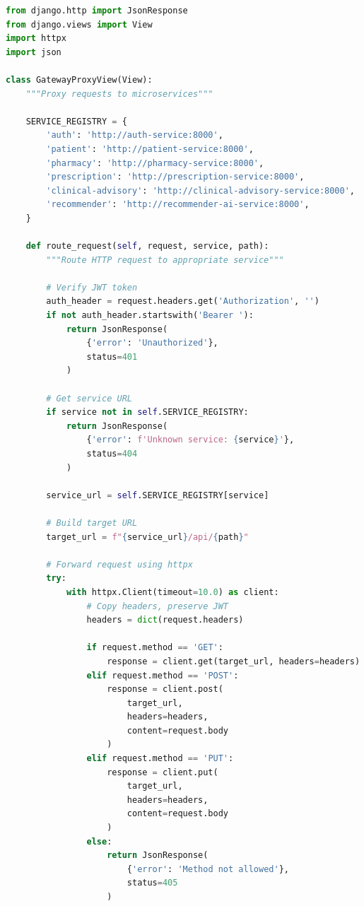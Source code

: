 \documentclass[12pt,a4paper]{article}
\begin{document}
\begin{lstlisting}[language=Python, caption=API Gateway Routing (api-gateway/app/views.py)]
from django.http import JsonResponse
from django.views import View
import httpx
import json

class GatewayProxyView(View):
    """Proxy requests to microservices"""
    
    SERVICE_REGISTRY = {
        'auth': 'http://auth-service:8000',
        'patient': 'http://patient-service:8000',
        'pharmacy': 'http://pharmacy-service:8000',
        'prescription': 'http://prescription-service:8000',
        'clinical-advisory': 'http://clinical-advisory-service:8000',
        'recommender': 'http://recommender-ai-service:8000',
    }
    
    def route_request(self, request, service, path):
        """Route HTTP request to appropriate service"""
        
        # Verify JWT token
        auth_header = request.headers.get('Authorization', '')
        if not auth_header.startswith('Bearer '):
            return JsonResponse(
                {'error': 'Unauthorized'}, 
                status=401
            )
        
        # Get service URL
        if service not in self.SERVICE_REGISTRY:
            return JsonResponse(
                {'error': f'Unknown service: {service}'}, 
                status=404
            )
        
        service_url = self.SERVICE_REGISTRY[service]
        
        # Build target URL
        target_url = f"{service_url}/api/{path}"
        
        # Forward request using httpx
        try:
            with httpx.Client(timeout=10.0) as client:
                # Copy headers, preserve JWT
                headers = dict(request.headers)
                
                if request.method == 'GET':
                    response = client.get(target_url, headers=headers)
                elif request.method == 'POST':
                    response = client.post(
                        target_url, 
                        headers=headers,
                        content=request.body
                    )
                elif request.method == 'PUT':
                    response = client.put(
                        target_url, 
                        headers=headers,
                        content=request.body
                    )
                else:
                    return JsonResponse(
                        {'error': 'Method not allowed'}, 
                        status=405
                    )
                

\end{lstlisting}
\end{document}
